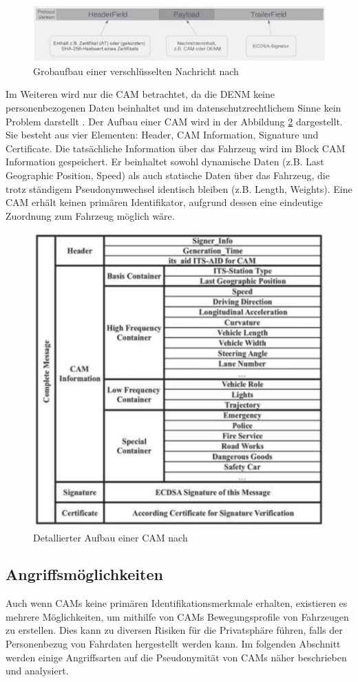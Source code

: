 \begin{figure}
	\centering
	\includegraphics[width=0.7\linewidth]{images/Nachrichtenaufbau}
	\caption{Grobaufbau einer verschlüsselten Nachricht nach \cite{Strubbe2017}}
	\label{fig:nachrichtenaufbau}
\end{figure}

Im Weiteren wird nur die CAM betrachtet, da die DENM keine personenbezogenen Daten beinhaltet und im datenschutzrechtlichem Sinne kein Problem darstellt \cite{Kiometzis2017}. Der Aufbau einer CAM wird in der Abbildung \ref{fig:cam} dargestellt. Sie besteht aus vier Elementen: Header, CAM Information, Signature und Certificate. Die tatsächliche Information über das Fahrzeug wird im Block CAM Information gespeichert. Er beinhaltet sowohl dynamische Daten (z.B. Last Geographic Position, Speed) als auch statische Daten über das Fahrzeug, die trotz ständigem Pseudonymwechsel identisch bleiben (z.B. Length, Weights). Eine CAM erhält keinen primären Identifikator, aufgrund dessen eine eindeutige Zuordnung zum Fahrzeug möglich wäre.

\begin{figure}
	\centering
	\includegraphics[width=0.4\linewidth]{images/CAM}
	\caption{Detallierter Aufbau einer CAM nach \cite{Kiometzis2017}}
	\label{fig:cam}
\end{figure}

\subsection{Angriffsmöglichkeiten}
\label{sec:FirstContentSection:ThirdSubSection}

Auch wenn CAMs keine primären Identifikationsmerkmale erhalten, existieren es mehrere Möglichkeiten, um mithilfe von CAMs Bewegungsprofile von Fahrzeugen zu erstellen. Dies kann zu diversen Risiken für die Privatsphäre führen, falls der Personenbezug von Fahrdaten hergestellt werden kann. Im folgenden Abschnitt werden einige Angriffsarten auf die Pseudonymität von CAMs näher beschrieben und analysiert. 

